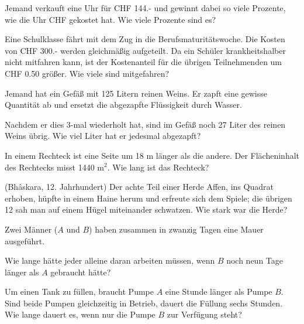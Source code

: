 \begin{bbwAufgabenBlock}

\item Jemand verkauft eine Uhr für CHF 144.- und gewinnt dabei so
viele Prozente, wie die Uhr CHF gekostet hat. Wie viele Prozente sind
es?


\item Eine  Schulklasse fährt mit dem Zug in die Berufsmaturitätswoche.
Die Kosten von CHF 300.- werden gleichmäßig aufgeteilt. Da ein Schüler
krankheitshalber nicht mitfahren kann, ist der Kostenanteil für die
übrigen Teilnehmenden um CHF 0.50 größer. Wie viele sind mitgefahren?


\item  Jemand hat ein Gefäß mit 125 Litern reinen Weins. Er zapft eine
gewisse Quantität ab und ersetzt die abgezapfte Flüssigkeit durch
Wasser.

Nachdem er dies 3-mal wiederholt hat, sind im Gefäß noch 27 Liter des
reinen Weins übrig. Wie viel Liter hat er jedesmal abgezapft?



\item In einem Rechteck ist eine Seite um 18 m länger als die andere.
Der Flächeninhalt des Rechtecks misst 1440 $\text{m}^2$. Wie lang ist das Rechteck?


\item (Bhâskara, 12. Jahrhundert) Der achte Teil einer Herde Affen,
ins Quadrat erhoben, hüpfte in einem Haine herum und erfreute sich dem
Spiele; die übrigen 12 sah man auf einem Hügel miteinander
schwatzen. Wie stark war die Herde?



\item Zwei Männer ($A$ und $B$) haben zusammen in zwanzig Tagen eine Mauer
ausgeführt.

Wie lange hätte jeder alleine daran arbeiten müssen, wenn $B$ noch neun Tage
länger als $A$ gebraucht hätte?


\item Um einen Tank zu füllen, braucht Pumpe $A$ eine Stunde länger als
Pumpe $B$. Sind beide Pumpen gleichzeitig in Betrieb, dauert die
Füllung sechs Stunden. Wie lange dauert es, wenn nur die Pumpe $B$ zur
Verfügung steht?


\end{bbwAufgabenBlock}
